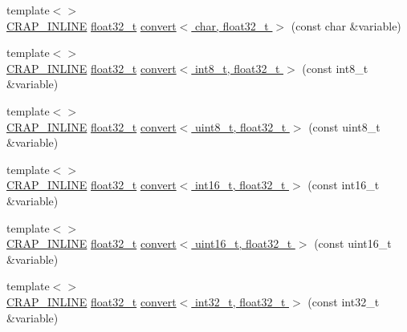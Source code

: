 \begin{DoxyCompactItemize}
\item 
{\footnotesize template$<$$>$ }\\\hyperlink{config__x86_8h_a5a40526b8d842e7ff731509998bb0f1c}{C\+R\+A\+P\+\_\+\+I\+N\+L\+I\+N\+E} \hyperlink{crap__types_8h_a4611b605e45ab401f02cab15c5e38715}{float32\+\_\+t} \hyperlink{namespacecrap_a4fa4fa9bcd38d2a914e31a1438951eaa}{convert$<$ char, float32\+\_\+t $>$} (const char \&variable)
\item 
{\footnotesize template$<$$>$ }\\\hyperlink{config__x86_8h_a5a40526b8d842e7ff731509998bb0f1c}{C\+R\+A\+P\+\_\+\+I\+N\+L\+I\+N\+E} \hyperlink{crap__types_8h_a4611b605e45ab401f02cab15c5e38715}{float32\+\_\+t} \hyperlink{namespacecrap_ad8802cf6b831b43c9900880903fbb834}{convert$<$ int8\+\_\+t, float32\+\_\+t $>$} (const int8\+\_\+t \&variable)
\item 
{\footnotesize template$<$$>$ }\\\hyperlink{config__x86_8h_a5a40526b8d842e7ff731509998bb0f1c}{C\+R\+A\+P\+\_\+\+I\+N\+L\+I\+N\+E} \hyperlink{crap__types_8h_a4611b605e45ab401f02cab15c5e38715}{float32\+\_\+t} \hyperlink{namespacecrap_ae13e7501216a4865af204060febbdfc5}{convert$<$ uint8\+\_\+t, float32\+\_\+t $>$} (const uint8\+\_\+t \&variable)
\item 
{\footnotesize template$<$$>$ }\\\hyperlink{config__x86_8h_a5a40526b8d842e7ff731509998bb0f1c}{C\+R\+A\+P\+\_\+\+I\+N\+L\+I\+N\+E} \hyperlink{crap__types_8h_a4611b605e45ab401f02cab15c5e38715}{float32\+\_\+t} \hyperlink{namespacecrap_ac8bc01b88cd649bd3ff88dc867a6f35d}{convert$<$ int16\+\_\+t, float32\+\_\+t $>$} (const int16\+\_\+t \&variable)
\item 
{\footnotesize template$<$$>$ }\\\hyperlink{config__x86_8h_a5a40526b8d842e7ff731509998bb0f1c}{C\+R\+A\+P\+\_\+\+I\+N\+L\+I\+N\+E} \hyperlink{crap__types_8h_a4611b605e45ab401f02cab15c5e38715}{float32\+\_\+t} \hyperlink{namespacecrap_a3bb40e8042f8dc5ac2ef08f73603f266}{convert$<$ uint16\+\_\+t, float32\+\_\+t $>$} (const uint16\+\_\+t \&variable)
\item 
{\footnotesize template$<$$>$ }\\\hyperlink{config__x86_8h_a5a40526b8d842e7ff731509998bb0f1c}{C\+R\+A\+P\+\_\+\+I\+N\+L\+I\+N\+E} \hyperlink{crap__types_8h_a4611b605e45ab401f02cab15c5e38715}{float32\+\_\+t} \hyperlink{namespacecrap_a9066413e045407109d32581fd6d63ce5}{convert$<$ int32\+\_\+t, float32\+\_\+t $>$} (const int32\+\_\+t \&variable)
\item 

\end{DoxyCompactItemize}
